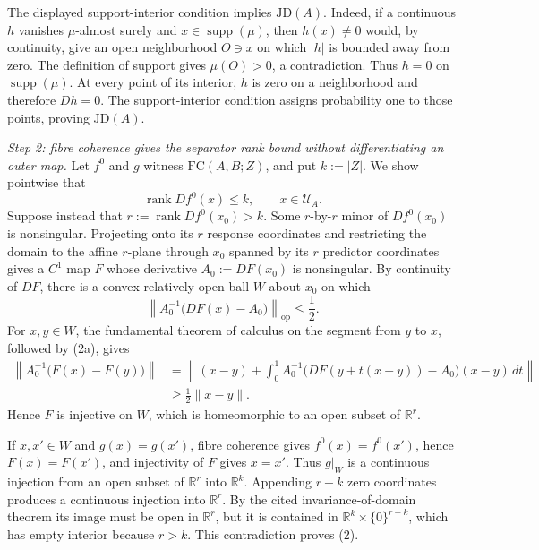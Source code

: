 The displayed support-interior condition implies \(\mathrm{JD}(A)\).  Indeed, if a continuous \(h\) vanishes \(\mu\)-almost surely and \(x\in\operatorname{supp}(\mu)\), then \(h(x)\neq0\) would, by continuity, give an open neighborhood \(O\ni x\) on which \(|h|\) is bounded away from zero.  The definition of support gives \(\mu(O)>0\), a contradiction.  Thus \(h=0\) on \(\operatorname{supp}(\mu)\).  At every point of its interior, \(h\) is zero on a neighborhood and therefore \(Dh=0\).  The support-interior condition assigns probability one to those points, proving \(\mathrm{JD}(A)\).

\emph{Step 2: fibre coherence gives the separator rank bound without differentiating an outer map.}
Let \(f^0\) and \(g\) witness \(\mathrm{FC}(A,B;Z)\), and put \(k:=|Z|\).  We show pointwise that
\[
 \operatorname{rank}Df^0(x)\leq k,\qquad x\in\mathcal U_A. \tag{2}
\]
Suppose instead that \(r:=\operatorname{rank}Df^0(x_0)>k\).  Some \(r\)-by-\(r\) minor of \(Df^0(x_0)\) is nonsingular.  Projecting onto its \(r\) response coordinates and restricting the domain to the affine \(r\)-plane through \(x_0\) spanned by its \(r\) predictor coordinates gives a \(C^1\) map \(F\) whose derivative \(A_0:=DF(x_0)\) is nonsingular.  By continuity of \(DF\), there is a convex relatively open ball \(W\) about \(x_0\) on which
\[
 \left\|A_0^{-1}\bigl(DF(x)-A_0\bigr)\right\|_{\mathrm{op}}\leq\frac12. \tag{2a}
\]
For \(x,y\in W\), the fundamental theorem of calculus on the segment from \(y\) to \(x\), followed by (2a), gives
\[
 \begin{aligned}
 \left\|A_0^{-1}\bigl(F(x)-F(y)\bigr)\right\|
 &=\left\|(x-y)+\int_0^1 A_0^{-1}\bigl(DF(y+t(x-y))-A_0\bigr)(x-y)\,dt\right\|\\
 &\geq \frac12\|x-y\|.
 \end{aligned} \tag{2b}
\]
Hence \(F\) is injective on \(W\), which is homeomorphic to an open subset of \(\mathbb R^r\).

If \(x,x'\in W\) and \(g(x)=g(x')\), fibre coherence gives \(f^0(x)=f^0(x')\), hence \(F(x)=F(x')\), and injectivity of \(F\) gives \(x=x'\).  Thus \(g|_W\) is a continuous injection from an open subset of \(\mathbb R^r\) into \(\mathbb R^k\).  Appending \(r-k\) zero coordinates produces a continuous injection into \(\mathbb R^r\).  By the cited invariance-of-domain theorem its image must be open in \(\mathbb R^r\), but it is contained in \(\mathbb R^k\times\{0\}^{r-k}\), which has empty interior because \(r>k\).  This contradiction proves (2).

